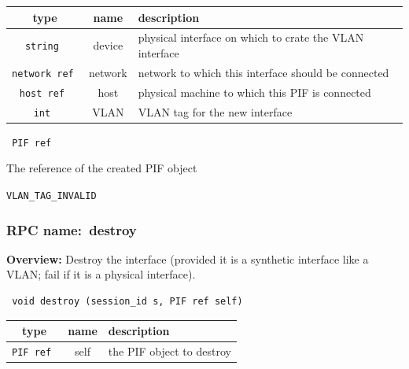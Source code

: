 
 
\vspace{0.3cm}
\begin{tabular}{|c|c|p{7cm}|}
 \hline
{\bf type} & {\bf name} & {\bf description} \\ \hline
{\tt string } & device & physical interface on which to crate the VLAN interface \\ \hline 

{\tt network ref } & network & network to which this interface should be connected \\ \hline 

{\tt host ref } & host & physical machine to which this PIF is connected \\ \hline 

{\tt int } & VLAN & VLAN tag for the new interface \\ \hline 

\end{tabular}

\vspace{0.3cm}

{\tt 
PIF ref
}


The reference of the created PIF object
\vspace{0.3cm}

 {\tt VLAN\_TAG\_INVALID}

\vspace{0.6cm}
\subsubsection{RPC name:~destroy}

{\bf Overview:} 
Destroy the interface (provided it is a synthetic interface like a VLAN;
fail if it is a physical interface).

\begin{verbatim} void destroy (session_id s, PIF ref self)\end{verbatim}



 
\vspace{0.3cm}
\begin{tabular}{|c|c|p{7cm}|}
 \hline
{\bf type} & {\bf name} & {\bf description} \\ \hline
{\tt PIF ref } & self & the PIF object to destroy \\ \hline 

\end{tabular}

